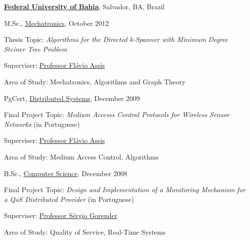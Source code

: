 \documentclass[10pt]{article}
\let\oldcite=\cite
\renewcommand{\cite}[1]{\footnotesize{\textbf{\oldcite{#1}}}\normalsize{}}
\begin{document}
\href{http://www.usp.br/}{\textbf{Federal University of Bahia}},
Salvador, BA, Brazil
\begin{outerlist}

\item[] M.Sc.,
        \href{http://wiki.dcc.ufba.br/Mecatronica/}
             {Mechatronics}, October 2012 \cite{Braga2012}
        \begin{innerlist}
        \item Thesis Topic: \emph{Algorithms for the Directed k-Spanner with Minimum Degree Steiner Tree Problem}
        \item Superviser:
              \href{http://wiki.dcc.ufba.br/DCC/ProfFlavioAssis}
                   {Professor Fl\'{a}vio Assis}
        \item Area of Study: Mechatronics, Algorithms and Graph Theory
        \end{innerlist}

\item[] PgCert,
        \href{http://www.lasid.ufba.br/easd}
             {Distributed Systems}, December 2009
        \begin{innerlist}
        \item Final Project Topic: \emph{Medium Accesss Control Protocols for Wireless Sensor Networks} (in Portuguese)
        \item Superviser:
              \href{http://wiki.dcc.ufba.br/DCC/ProfFlavioAssis}
                   {Professor Fl\'{a}vio Assis}
        \item Area of Study: Medium Access Control, Algorithms
        \end{innerlist}

\item[] B.Sc.,
        \href{http://wiki.dcc.ufba.br/DCC/}
             {Computer Science}, December 2008
        \begin{innerlist}
	\item Final Project Topic: \emph{Design and Implementation of a Monitoring Mechanism for a QoS Distributed Provider } (in Portuguese)
	\item Superviser:
              \href{http://wiki.dcc.ufba.br/DCC/ProfSergioGorender}
                   {Professor S\'{e}rgio Gorender}
        \item Area of Study: Quality of Service, Real-Time Systems
        \end{innerlist}

\end{outerlist}
\end{document}
